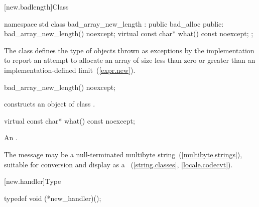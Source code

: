 %
[new.badlength]{Class }

\begin{codeblock}
namespace std {
  class bad_array_new_length : public bad_alloc {
  public:
    bad_array_new_length() noexcept;
    virtual const char* what() const noexcept;
  };
}
\end{codeblock}

\pnum
The class  defines the type of objects thrown as
exceptions by the implementation to report an attempt to allocate an array of size
less than zero or
greater than an implementation-defined limit~(\ref{expr.new}).

%
\begin{itemdecl}
bad_array_new_length() noexcept;
\end{itemdecl}

\begin{itemdescr}
\pnum
\effects constructs an object of class .
\end{itemdescr}

%
\begin{itemdecl}
virtual const char* what() const noexcept;
\end{itemdecl}

\begin{itemdescr}
\pnum
\returns
{}%
An  \ntbs.

\pnum
\remarks
The message may be a null-terminated multibyte string~(\ref{multibyte.strings}),
suitable for conversion and display as a
~(\ref{string.classes}, \ref{locale.codecvt}).
\end{itemdescr}

[new.handler]{Type }

%
\begin{itemdecl}
typedef void (*new_handler)();
\end{itemdecl}

